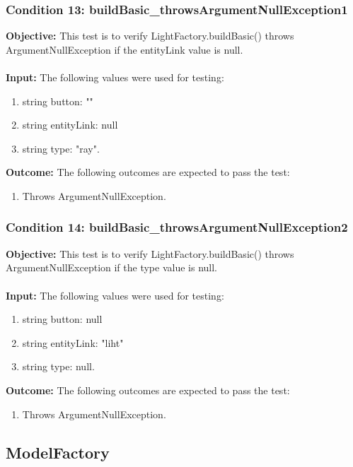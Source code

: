 \documentclass[a4paper,12pt]{article}
\begin{document}
		\subsubsection{Condition 13: buildBasic\_throwsArgumentNullException1}
			\textbf{Objective:} This test is to verify  LightFactory.buildBasic() throws ArgumentNullException if the entityLink value is null.\\\\
			\textbf{Input:} The following values were used for testing:
				\begin{enumerate}
					\item string button: ""
					\item string entityLink: null
					\item string type: "ray".
				\end{enumerate}
			\textbf{Outcome:} The following outcomes are expected to pass the test:
				\begin{enumerate}
					\item Throws ArgumentNullException.
				\end{enumerate}
		\subsubsection{Condition 14: buildBasic\_throwsArgumentNullException2}
			\textbf{Objective:} This test is to verify  LightFactory.buildBasic() throws ArgumentNullException if the type value is null.\\\\
			\textbf{Input:} The following values were used for testing:
				\begin{enumerate}
					\item string button: null
					\item string entityLink: "liht"
					\item string type: null.
				\end{enumerate}
			\textbf{Outcome:} The following outcomes are expected to pass the test:
				\begin{enumerate}
					\item Throws ArgumentNullException.
				\end{enumerate}
	\subsection{ModelFactory}
\end{document}
